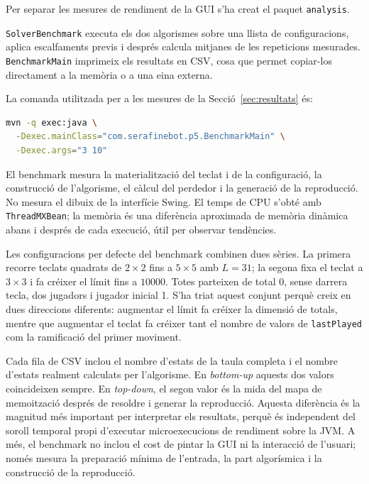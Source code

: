 \documentclass[conference,compsoc]{IEEEtran}
\begin{document}
Per separar les mesures de rendiment de la GUI s'ha creat el paquet
\texttt{analysis}.

\texttt{SolverBenchmark} executa els dos algorismes sobre una
llista de configuracions, aplica escalfaments previs i després calcula mitjanes
de les repeticions mesurades. \texttt{BenchmarkMain} imprimeix els resultats en
CSV, cosa que permet copiar-los directament a la memòria o a una eina externa.

La comanda utilitzada per a les mesures de la Secció~\ref{sec:resultats} és:

\begin{lstlisting}[language=bash,caption={Execució del benchmark de P5.},label={lst:benchmark}]
mvn -q exec:java \
  -Dexec.mainClass="com.serafinebot.p5.BenchmarkMain" \
  -Dexec.args="3 10"
\end{lstlisting}

El benchmark mesura la materialització del teclat i de la configuració, la
construcció de l'algorisme, el càlcul del perdedor i la generació de la
reproducció. No mesura el dibuix de la interfície Swing. El temps de CPU s'obté
amb \texttt{ThreadMXBean}; la memòria és una diferència
aproximada de memòria dinàmica abans i després de cada execució, útil per observar tendències.

Les configuracions per defecte del benchmark combinen dues sèries. La primera
recorre teclats quadrats de $2\times2$ fins a $5\times5$ amb $L=31$; la segona
fixa el teclat a $3\times3$ i fa créixer el límit fins a $10000$. Totes parteixen
de total 0, sense darrera tecla, dos jugadors i jugador inicial 1. S'ha triat
aquest conjunt perquè creix en dues direccions diferents: augmentar el límit fa
créixer la dimensió de totals, mentre que augmentar el teclat fa créixer tant el
nombre de valors de \texttt{lastPlayed} com la ramificació del primer moviment.

Cada fila de CSV inclou el nombre d'estats de la taula completa i el nombre
d'estats realment calculats per l'algorisme. En \textit{bottom-up} aquests dos valors
coincideixen sempre. En \textit{top-down}, el segon valor és la mida del mapa de
memoització després de resoldre i generar la reproducció. Aquesta diferència és la
magnitud més important per interpretar els resultats, perquè és independent del
soroll temporal propi d'executar microexecucions de rendiment sobre la JVM. A més,
el benchmark no inclou el cost de pintar la GUI ni la interacció de l'usuari;
només mesura la preparació mínima de l'entrada, la part algorísmica i la
construcció de la reproducció.
\end{document}
